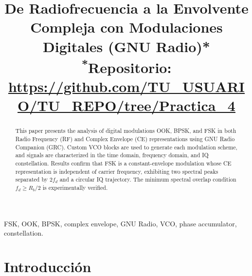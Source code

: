 \documentclass[conference]{IEEEtran}
\begin{document}
\title{De Radiofrecuencia a la Envolvente Compleja con Modulaciones Digitales (GNU Radio)*\\
{\footnotesize \textsuperscript{*}Repositorio: \url{https://github.com/TU_USUARIO/TU_REPO/tree/Practica_4}}}

\author{
\and
{}
\and
{}
}

\maketitle

\begin{abstract}
This paper presents the analysis of digital modulations OOK, BPSK, and FSK in both 
Radio Frequency (RF) and Complex Envelope (CE) representations using GNU Radio 
Companion (GRC). Custom VCO blocks are used to generate each modulation scheme, 
and signals are characterized in the time domain, frequency domain, and IQ 
constellation. Results confirm that FSK is a constant-envelope modulation whose 
CE representation is independent of carrier frequency, exhibiting two spectral 
peaks separated by $2f_d$ and a circular IQ trajectory. The minimum spectral 
overlap condition $f_d \geq R_b/2$ is experimentally verified.
\end{abstract}

\begin{IEEEkeywords}
FSK, OOK, BPSK, complex envelope, GNU Radio, VCO, phase accumulator, constellation.
\end{IEEEkeywords}

\section{Introducción}
\end{document}

